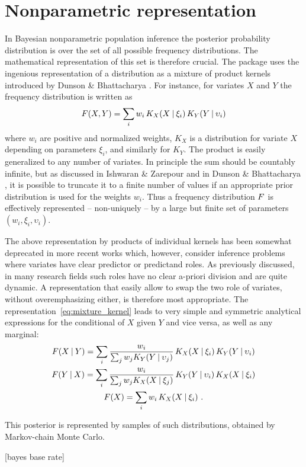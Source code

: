 \documentclass{article}
\begin{document}
\section{Nonparametric representation}
\label{sec:representation}

In Bayesian nonparametric population inference the posterior probability distribution is over the set of all possible frequency distributions. The mathematical representation of this set is therefore crucial. The package uses the ingenious representation of a distribution as a mixture of product kernels introduced by Dunson \& Bhattacharya \citeyear{dunsonetal2011}. For instance, for variates $X$ and $Y$ the frequency distribution is written as
\begin{equation}
  \label{eq:mixture_kernel}
  \yF(X, Y) = \sum_{i} w_{i}\, K_{X}(X \| \xi_{i})\, K_{Y}(Y \| \upsilon_{i})
\end{equation}
where $w_{i}$ are positive and normalized weights, $K_{X}$ is a distribution for variate $X$ depending on parameters $\xi_{i}$, and similarly for $K_{Y}$. The product is easily generalized to any number of variates. In principle the sum should be countably infinite, but as discussed in Ishwaran \& Zarepour \citeyear{ishwaranetal2002b,ishwaranetal2002c} and in Dunson \& Bhattacharya \citeyear{dunsonetal2011}, it is possible to truncate it to a finite number of values if an appropriate prior distribution is used for the weights $w_{i}$. Thus a frequency distribution $F$ is effectively represented -- non-uniquely -- by a large but finite set of parameters $(w_{i}, \xi_{i}, \upsilon_{i})$.


The above representation by products of individual kernels has been somewhat deprecated in more recent works \citep[e.g.][]{wadeetal2014,wadeetal2014b} which, however, consider inference problems where variates have clear predictor or predictand roles. As previously discussed, in many research fields such roles have no clear a-priori division and are quite dynamic. A representation that easily allow to swap the two role of variates, without overemphasizing either, is therefore most appropriate. The representation~\eqref{eq:mixture_kernel} leads to very simple and symmetric analytical expressions for the conditional of $X$ given $Y$ and vice versa, as well as any marginal:
\begin{equation*}
  \begin{gathered}
    \yF(X \| Y) = \sum_{i}
    \frac{w_{i}}{\sum_{j} w_{j}K_{Y}(Y \| \upsilon_{j})}\, K_{X}(X \| \xi_{i})\, K_{Y}(Y \| \upsilon_{i})
    \\
    \yF(Y \| X) = \sum_{i}
    \frac{w_{i}}{\sum_{j} w_{j}K_{X}(X \| \xi_{j})}\, K_{Y}(Y \| \upsilon_{i})\, K_{X}(X \| \xi_{i})
    \\
    \yF(X) = \sum_{i}
    w_{i}\, K_{X}(X \| \xi_{i}) \ .
  \end{gathered}
\end{equation*}



This posterior is represented by samples of such distributions, obtained by Markov-chain Monte Carlo.




[bayes base rate]


\citep{walker2010}



\end{document}
